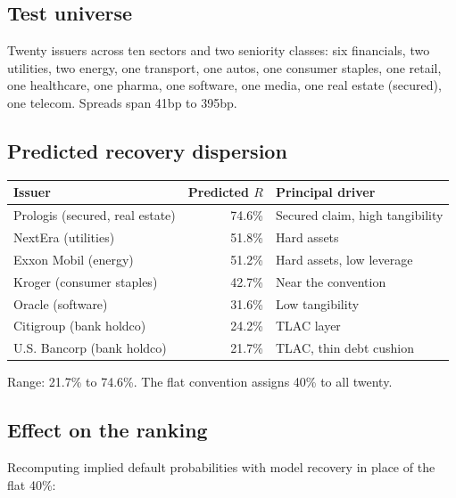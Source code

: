 \documentclass[11pt,a4paper]{article}
\begin{document}
\subsection{Test universe}

Twenty issuers across ten sectors and two seniority classes: six financials, two
utilities, two energy, one transport, one autos, one consumer staples, one retail, one
healthcare, one pharma, one software, one media, one real estate (secured), one telecom.
Spreads span 41bp to 395bp.

\subsection{Predicted recovery dispersion}

\begin{center}
\begin{tabular}{lrl}
\toprule
\textbf{Issuer} & \textbf{Predicted $R$} & \textbf{Principal driver} \\
\midrule
Prologis (secured, real estate) & 74.6\% & Secured claim, high tangibility \\
NextEra (utilities) & 51.8\% & Hard assets \\
Exxon Mobil (energy) & 51.2\% & Hard assets, low leverage \\
Kroger (consumer staples) & 42.7\% & Near the convention \\
Oracle (software) & 31.6\% & Low tangibility \\
Citigroup (bank holdco) & 24.2\% & TLAC layer \\
U.S. Bancorp (bank holdco) & 21.7\% & TLAC, thin debt cushion \\
\bottomrule
\end{tabular}
\end{center}

Range: 21.7\% to 74.6\%. The flat convention assigns 40\% to all twenty.

\subsection{Effect on the ranking}

Recomputing implied default probabilities with model recovery in place of the flat 40\%:
\end{document}
